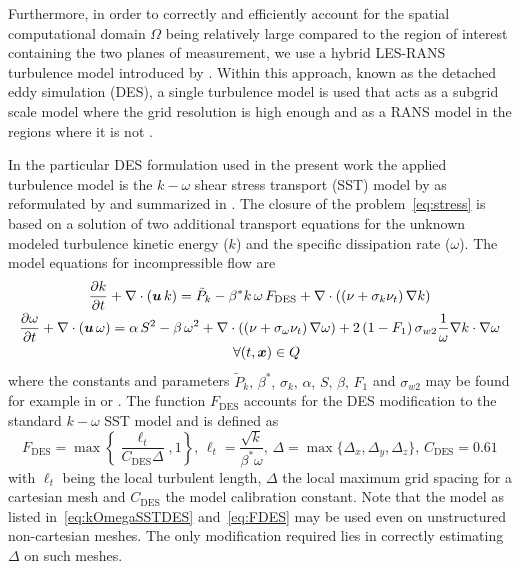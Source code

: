 Furthermore, in order to correctly and efficiently account for the spatial computational domain $\Omega$ being relatively large compared to the region of interest containing the two planes of measurement, we use a hybrid LES-RANS turbulence model introduced by \citet{strelets2001}. Within this approach, known as the detached eddy simulation (DES), a single turbulence model is used that acts as a subgrid scale model where the grid resolution is high enough and as a RANS model in the regions where it is not \citep{strelets2001}.

In the particular DES formulation used in the present work the applied turbulence model is the $k-\omega$ shear stress transport (SST) model by \citet{menter1992} as reformulated by \citet{hellsten1997} and summarized in \citep{menter2003}. The closure of the problem~\eqref{eq:stress} is based on a solution of two additional transport equations for the unknown modeled turbulence kinetic energy ($k$) and the specific dissipation rate ($\omega$). The model equations for incompressible flow are
\begin{equation}
\label{eq:kOmegaSSTDES}
    \begin{array}{*1{>{\displaystyle}c}}
        \frac{\partial {k}}{\partial t} + \nabla \cdot \left( \bm{u}\, k\right) = \tilde{P}_{k} - \beta^{*}k\,\omega\,F_{\mathrm{DES}} + \nabla \cdot \left(\left(\nu + \sigma_{k}\nu_{t}\right)\nabla k\right)\\[0.2cm]
        \frac{\partial {\omega}}{\partial t} + \nabla \cdot \left( \bm{u}\, \omega\right) = \alpha\,S^{2} - \beta\,\omega^{2} + \nabla \cdot \left(\left(\nu + \sigma_{\omega}\nu_{t}\right)\nabla \omega\right) + 2\left(1-F_{1}\right)\sigma_{w2}\frac{1}{\omega}\nabla k \cdot \nabla \omega\\[0.2cm]
        \quad \forall (t,\bm{x})\in Q
    \end{array}
\end{equation}
where the constants and parameters $\tilde{P}_{k},\,\beta^{*},\,\sigma_{k},\,\alpha,\,S,\,\beta,\,F_{1}$ and $\sigma_{w2}$ may be found for example in \citep{hellsten1997} or \citep{menter2003}. The function $F_{\mathrm{DES}}$ accounts for the DES modification to the standard $k-\omega$ SST model and is defined as
\begin{equation}
\label{eq:FDES}
    F_{\mathrm{DES}} = \max\left\{\frac{\ell_{t}}{C_{\mathrm{DES}}\Delta},1 \right\},\,\ell_{t} = \frac{\sqrt{k}}{\beta^{*}\omega},\,\Delta = \max\{\Delta_{x},\Delta_{y},\Delta_{z}\},\,C_{\mathrm{DES}} = 0.61
\end{equation}
with $\ell_{t}$ being the local turbulent length, $\Delta$ the local maximum grid spacing for a cartesian mesh and $C_{\mathrm{DES}}$ the model calibration constant. Note that the model as listed in~\eqref{eq:kOmegaSSTDES} and~\eqref{eq:FDES} may be used even on unstructured non-cartesian meshes. The only modification required lies in correctly estimating $\Delta$ on such meshes.

